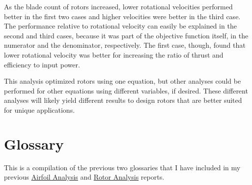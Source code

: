 \documentclass{article}
\begin{document}
 As the blade count of rotors increased, lower rotational velocities performed better in the first two cases and higher velocities were better in the third case. The performance relative to rotational velocity can easily be explained in the second and third cases, because it was part of the objective function itself, in the numerator and the denominator, respectively. The first case, though, found that lower rotational velocity was better for increasing the ratio of thrust and efficiency to input power. \newline
 
 This analysis optimized rotors using one equation, but other analyses could be performed for other equations using different variables, if desired. These different analyses will likely yield different results to design rotors that are better suited for unique applications. \newline

\clearpage

\section{Glossary}

This is a compilation of the previous two glossaries that I have included in my previous \href{https://github.com/JoeSpencer1/497R-Projects/blob/Rotor-Analysis/Airfoil Analysis/Airfoil_Analysis.pdf}{Airfoil Analysis} and \href{https://github.com/JoeSpencer1/497R-Projects/blob/Rotor-Analysis/Rotor Analysis/Rotor_Analysis.pdf}{Rotor Analysis} reports.
\end{document}
